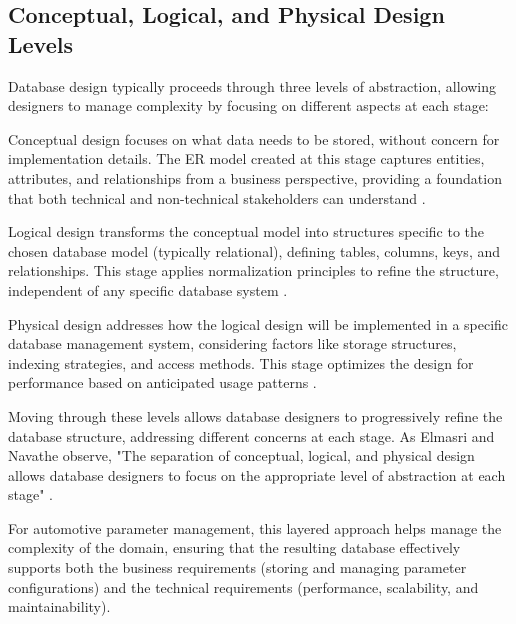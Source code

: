 \subsection{Conceptual, Logical, and Physical Design Levels}
\label{subsec:design-levels}

Database design typically proceeds through three levels of abstraction, allowing designers to manage complexity by focusing on different aspects at each stage:

Conceptual design focuses on what data needs to be stored, without concern for implementation details. The ER model created at this stage captures entities, attributes, and relationships from a business perspective, providing a foundation that both technical and non-technical stakeholders can understand \cite{elmasri2015fundamentals}.

Logical design transforms the conceptual model into structures specific to the chosen database model (typically relational), defining tables, columns, keys, and relationships. This stage applies normalization principles to refine the structure, independent of any specific database system \cite{elmasri2015fundamentals}.

Physical design addresses how the logical design will be implemented in a specific database management system, considering factors like storage structures, indexing strategies, and access methods. This stage optimizes the design for performance based on anticipated usage patterns \cite{obe2017postgresql}.

Moving through these levels allows database designers to progressively refine the database structure, addressing different concerns at each stage. As Elmasri and Navathe observe, "The separation of conceptual, logical, and physical design allows database designers to focus on the appropriate level of abstraction at each stage" \cite{elmasri2015fundamentals}.

For automotive parameter management, this layered approach helps manage the complexity of the domain, ensuring that the resulting database effectively supports both the business requirements (storing and managing parameter configurations) and the technical requirements (performance, scalability, and maintainability).
